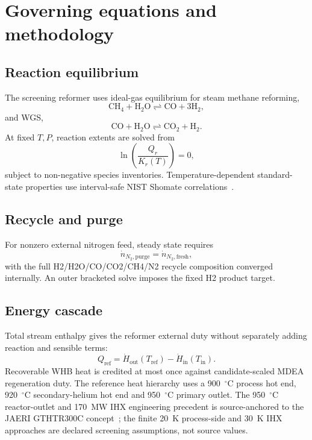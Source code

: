 \section{Governing equations and methodology}
\subsection{Reaction equilibrium}
The screening reformer uses ideal-gas equilibrium for steam methane reforming,
\begin{equation}
\mathrm{CH_4+H_2O\rightleftharpoons CO+3H_2},
\end{equation}
and WGS,
\begin{equation}
\mathrm{CO+H_2O\rightleftharpoons CO_2+H_2}.
\end{equation}
At fixed $T,P$, reaction extents are solved from
\begin{equation}
\ln\left(\frac{Q_r}{K_r(T)}\right)=0,
\end{equation}
subject to non-negative species inventories. Temperature-dependent standard-state properties use interval-safe NIST Shomate correlations~\cite{nistwebbook}.

\subsection{Recycle and purge}
For nonzero external nitrogen feed, steady state requires
\begin{equation}
\dot n_{N_2,\mathrm{purge}}=\dot n_{N_2,\mathrm{fresh}},
\end{equation}
with the full H2/H2O/CO/CO2/CH4/N2 recycle composition converged internally. An outer bracketed solve imposes the fixed H2 product target.

\subsection{Energy cascade}
Total stream enthalpy gives the reformer external duty without separately adding reaction and sensible terms:
\begin{equation}
Q_{\mathrm{ref}}=\dot H_{\mathrm{out}}(T_{\mathrm{ref}})
-\dot H_{\mathrm{in}}(T_{\mathrm{in}}).
\end{equation}
Recoverable WHB heat is credited at most once against candidate-scaled MDEA regeneration duty. The reference heat hierarchy uses a 900~$^\circ$C process hot end, 920~$^\circ$C secondary-helium hot end and 950~$^\circ$C primary outlet. The 950~$^\circ$C reactor-outlet and 170~MW IHX engineering precedent is source-anchored to the JAERI GTHTR300C concept~\cite{jaeri2004gthtr300c}; the finite 20~K process-side and 30~K IHX approaches are declared screening assumptions, not source values.

